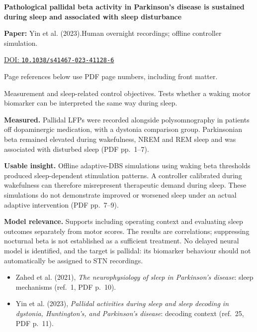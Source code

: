 

{\Large\bfseries Pathological pallidal beta activity in Parkinson's disease is sustained during sleep and associated with sleep disturbance\par}

\textbf{Paper:} Yin et al. (2023).\quad Human overnight recordings; offline controller simulation.\par
\href{https://doi.org/10.1038/s41467-023-41128-6}{DOI: \nolinkurl{10.1038/s41467-023-41128-6}}\par
{\footnotesize Page references below use PDF page numbers, including front matter.}

Measurement and sleep-related control objectives. Tests whether a waking motor biomarker can be interpreted the same way during sleep.

\textbf{Measured.} Pallidal LFPs were recorded alongside polysomnography in patients off dopaminergic medication, with a dystonia comparison group. Parkinsonian beta remained elevated during wakefulness, NREM and REM sleep and was associated with disturbed sleep (PDF pp.~1--7).

\textbf{Usable insight.} Offline adaptive-DBS simulations using waking beta thresholds produced sleep-dependent stimulation patterns. A controller calibrated during wakefulness can therefore misrepresent therapeutic demand during sleep. These simulations do not demonstrate improved or worsened sleep under an actual adaptive intervention (PDF pp.~7--9).

\textbf{Model relevance.} Supports including operating context and evaluating sleep outcomes separately from motor scores. The results are correlations; suppressing nocturnal beta is not established as a sufficient treatment. No delayed neural model is identified, and the target is pallidal: its biomarker behaviour should not automatically be assigned to STN recordings.

\begin{itemize}
\item Zahed et al. (2021), \emph{The neurophysiology of sleep in Parkinson's disease}: sleep mechanisms (ref.~1, PDF p.~10).
\item Yin et al. (2023), \emph{Pallidal activities during sleep and sleep decoding in dystonia, Huntington's, and Parkinson's disease}: decoding context (ref.~25, PDF p.~11).
\end{itemize}


